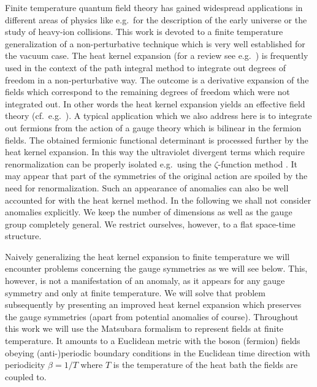 \documentclass[a4paper,showpacs,showkeys,prd,nofootinbib]{revtex4}
\begin{document}
Finite temperature quantum field theory has gained widespread applications in different
areas of physics
like e.g.~for the description of the early universe or the study of heavy-ion collisions.
This work is devoted to a finite temperature generalization of a non-perturbative
technique which is very well established for the vacuum case. 
The heat kernel expansion \cite{Schwinger:1951nm,dewitt,Seeley:1967ea}
(for a review see e.g.~\cite{Ball:1989xg})
is frequently used in the context of the path integral
method to integrate out degrees of freedom in a non-perturbative way. The outcome
is a derivative expansion of the fields which correspond to the remaining degrees of 
freedom which were not integrated out. In other words the heat kernel expansion
yields an effective field theory (cf.~e.g.~\cite{Ball:1989xg,espraf,gasleut1}). 
A typical application
which we also address here is to integrate out fermions from the action of a gauge
theory which is bilinear in the fermion fields. The obtained fermionic functional 
determinant is processed further by the heat kernel expansion. In this way the 
ultraviolet divergent terms which require renormalization can be properly isolated
e.g.~using the $\zeta$-function method \cite{Ball:1989xg}. It may appear that part of 
the symmetries of the original action are spoiled by the need for renormalization.
Such an appearance of anomalies can also be well accounted for with the heat kernel
method. In the following we shall not consider anomalies explicitly. We keep
the number of dimensions as well as the gauge group completely general. We restrict
ourselves, however, to a flat space-time structure.

Naively generalizing
the heat kernel expansion to finite temperature we will encounter problems concerning
the gauge symmetries as we will see below. 
This, however, is not a manifestation of an anomaly, as it
appears for any gauge symmetry and only at finite temperature. We will solve that
problem subsequently by presenting an improved heat kernel expansion which preserves
the gauge symmetries (apart from potential anomalies of course). Throughout this
work we will use the Matsubara formalism \cite{Matsubara:1955ws,Das:1997gg} 
to represent fields at 
finite temperature. It amounts to a Euclidean metric with the boson (fermion) fields
obeying (anti-)periodic boundary conditions in the Euclidean time direction with
periodicity $\beta=1/T$ where $T$ is the temperature of the heat bath the fields are
coupled to. 
\end{document}
